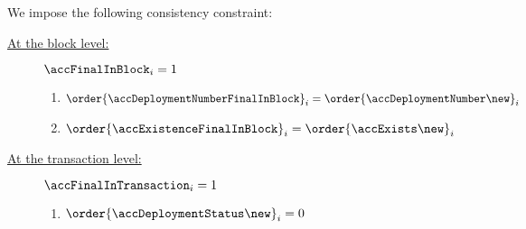 We impose the following consistency constraint:
\begin{description}
	\item[\underline{At the block level:}]
		\If $\accFinalInBlock _{i} = 1$ \Then
		\begin{enumerate}
			\item $\order{\accDeploymentNumberFinalInBlock} _{i} = \order{\accDeploymentNumber\new} _{i}$
			\item $\order{\accExistenceFinalInBlock}        _{i} = \order{\accExists\new}          _{i}$
		\end{enumerate}
		\item[\underline{At the transaction level:}]
			\If $\accFinalInTransaction _{i} = 1$ \Then
		\begin{enumerate}
			\item $\order{\accDeploymentStatus\new} _{i} = 0$
		\end{enumerate}
\end{description}
